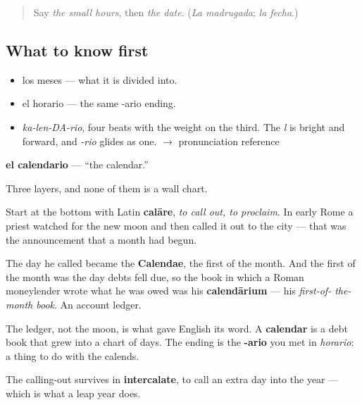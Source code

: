 \label{lesson:ES-C343-calendario}



\begin{quote}
Say \emph{the small hours}, then \emph{the date}. (\emph{La madrugada}; \emph{la fecha}.)
\end{quote}

\subsection*{What to know first}
\begin{itemize}
\raggedright
  \item los meses — what it is divided into.
  \item el horario — the same -ario ending.
\end{itemize}

\begin{sounds}
\begin{itemize}
\raggedright
  \item \emph{ka-len-DA-rio}, four beats with the weight on the third. The \emph{l} is bright and forward, and \emph{-rio} glides as one. $\to$ pronunciation reference
\end{itemize}
\end{sounds}

\begin{cousinweb}
\textbf{el calendario} — \textquotedblleft{}the calendar.\textquotedblright{}

Three layers, and none of them is a wall chart.

Start at the bottom with Latin \textbf{calāre}, \emph{to call out, to proclaim}. In early Rome a priest watched for the new moon and then called it out to the city — that was the announcement that a month had begun.

The day he called became the \textbf{Calendae}, the first of the month. And the first of the month was the day debts fell due, so the book in which a Roman moneylender wrote what he was owed was his \textbf{calendārium} — his \emph{first-of- the-month book}. An account ledger.

The ledger, not the moon, is what gave English its word. A \textbf{calendar} is a debt book that grew into a chart of days. The ending is the \textbf{-ario} you met in \emph{horario}: a thing to do with the calends.

The calling-out survives in \textbf{intercalate}, to call an extra day into the year — which is what a leap year does.
\end{cousinweb}

